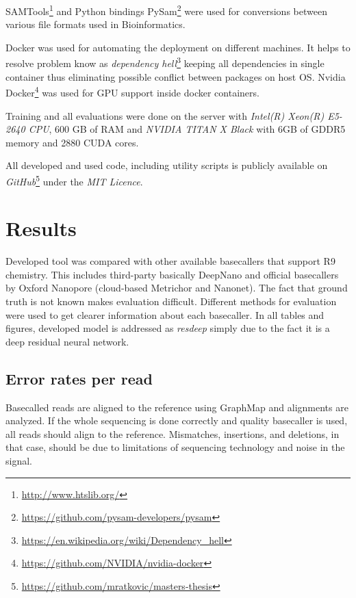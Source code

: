 \documentclass[times, utf8, diplomski, numeric, english]{fer}
\begin{document}
SAMTools\footnote{\url{http://www.htslib.org/}} and Python bindings PySam\footnote{\url{https://github.com/pysam-developers/pysam}} were used for conversions between various file formats used in Bioinformatics.

Docker was used for automating the deployment on different machines. It helps to resolve problem know as \textit{dependency hell}\footnote{\url{https://en.wikipedia.org/wiki/Dependency_hell}}  keeping all dependencies in single container thus eliminating possible conflict between packages on host OS.
Nvidia Docker\footnote{\url{https://github.com/NVIDIA/nvidia-docker}} was used for GPU support inside docker containers.


Training and all evaluations were done on the server with  \textit{Intel(R) Xeon(R) E5-2640 CPU}, 600 GB of RAM and \textit{NVIDIA TITAN X Black} with 6GB of GDDR5 memory and 2880 CUDA cores.

All developed and used code, including utility scripts is publicly available on \textit{GitHub}\footnote{\url{https://github.com/mratkovic/masters-thesis}} under the \textit{MIT Licence}.

\chapter{Results}
Developed tool was compared with other available basecallers that support R9 chemistry. This includes third-party basically DeepNano and official basecallers by Oxford Nanopore (cloud-based Metrichor and Nanonet).
The fact that ground truth is not known makes evaluation difficult. 
Different methods for evaluation were used to get clearer information about each basecaller.
In all tables and figures, developed model is addressed as \textit{resdeep} simply due to the fact it is a deep residual neural network.



\section{Error rates per read}

Basecalled reads are aligned to the reference using GraphMap and alignments are analyzed. If the whole sequencing is done correctly and quality basecaller is used, all reads should align to the reference. Mismatches, insertions, and deletions, in that case, should be due to limitations of sequencing technology and noise in the signal.
\end{document}
